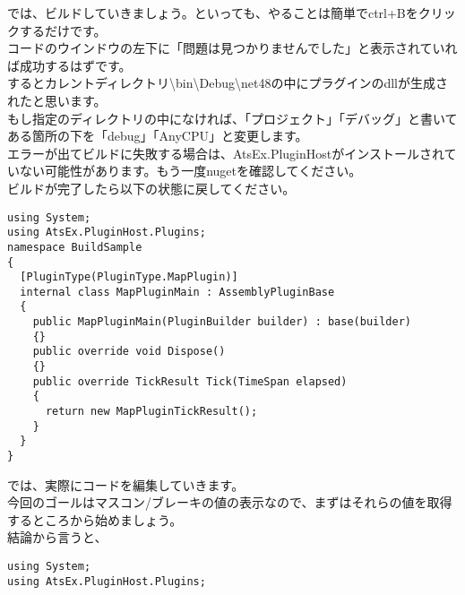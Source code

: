 \documentclass[b5paper,9pt,platex,dvipdfmx]{jsarticle}
\begin{document}
\begin{multicols*}{3}
では、ビルドしていきましょう。といっても、やることは簡単でctrl+Bをクリックするだけです。\\
コードのウインドウの左下に「問題は見つかりませんでした」と表示されていれば成功するはずです。\\
するとカレントディレクトリ\textbackslash bin\textbackslash Debug\textbackslash net48の中にプラグインのdllが生成されたと思います。\\
もし指定のディレクトリの中になければ、「プロジェクト」「デバッグ」と書いてある箇所の下を「debug」「AnyCPU」と変更します。\\
エラーが出てビルドに失敗する場合は、AtsEx.PluginHostがインストールされていない可能性があります。もう一度nugetを確認してください。\\
ビルドが完了したら以下の状態に戻してください。
\begin{lstlisting}[caption=MapPlugin.cs]
using System;
using AtsEx.PluginHost.Plugins;
namespace BuildSample
{
  [PluginType(PluginType.MapPlugin)]
  internal class MapPluginMain : AssemblyPluginBase
  {
    public MapPluginMain(PluginBuilder builder) : base(builder)
    {}
    public override void Dispose()
    {}
    public override TickResult Tick(TimeSpan elapsed)
    {
      return new MapPluginTickResult();
    }
  }
}
\end{lstlisting}
では、実際にコードを編集していきます。\\
今回のゴールはマスコン/ブレーキの値の表示なので、まずはそれらの値を取得するところから始めましょう。\\
結論から言うと、
\begin{lstlisting}[caption= MapPlugin.cs]
using System;
using AtsEx.PluginHost.Plugins;


\end{lstlisting}
\end{multicols*}
\end{document}
